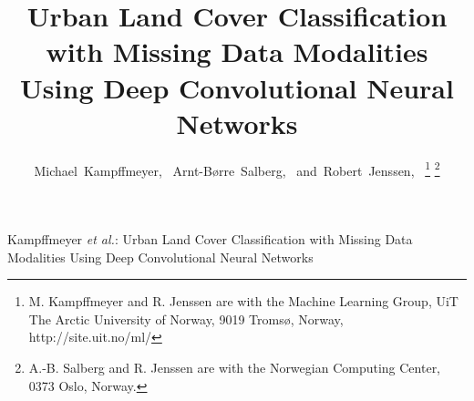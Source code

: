 \documentclass[journal]{IEEEtran}
\begin{document}
%
\title{Urban Land Cover Classification with Missing Data Modalities Using Deep Convolutional Neural Networks}

\author{Michael~Kampffmeyer,~
        Arnt-B{\o}rre~Salberg,~
        and~Robert~Jenssen,~%
\thanks{M. Kampffmeyer and R. Jenssen are with the Machine Learning Group, UiT The Arctic University of Norway, 9019 Troms{\o}, Norway, http://site.uit.no/ml/}%
\thanks{A.-B. Salberg and R. Jenssen are with the Norwegian Computing Center, 0373 Oslo, Norway.}%
}

\markboth{}%
{Kampffmeyer \MakeLowercase{\textit{et al.}}: Urban Land Cover Classification with Missing Data Modalities Using Deep Convolutional Neural Networks}
% 

\maketitle
\end{document}

